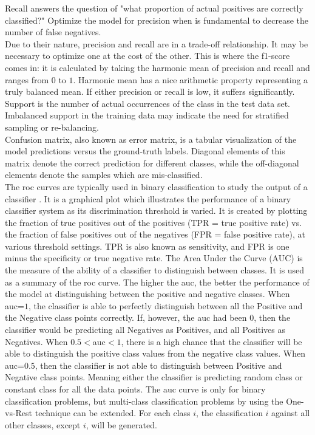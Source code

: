 \noindent Recall answers the question of "what proportion of actual positives are correctly  classified?" Optimize the model for precision when is fundamental to decrease the number of false negatives. \\

\noindent Due to their nature, precision and recall are in a trade-off relationship. It may be necessary to optimize one at the cost of the other. This is where the f1-score comes in: it is calculated by taking the harmonic mean of precision and recall and ranges from $0$ to $1$. Harmonic mean has a nice arithmetic property representing a truly balanced mean. If either precision or recall is low, it suffers significantly. \\

\noindent Support is the number of actual occurrences of the class in the test data set. Imbalanced support in the training data may indicate the need for stratified sampling or re-balancing. \\

\noindent Confusion matrix, also known as error matrix, is a tabular visualization of the model predictions versus the ground-truth labels. Diagonal elements of this matrix denote the correct prediction for different classes, while the off-diagonal elements denote the samples which are mis-classified. \\

\noindent The \gls{roc} curves are typically used in binary classification to study the output of a classifier \cite{Receiver5:online}. It is a graphical plot which illustrates the performance of a binary classifier system as its discrimination threshold is varied. It is created by plotting the fraction of true positives out of the positives (TPR = true positive rate) vs. the fraction of false positives out of the negatives (FPR = false positive rate), at various threshold settings. TPR is also known as sensitivity, and FPR is one minus the specificity or true negative rate. The Area Under the Curve (AUC) is the measure of the ability of a classifier to distinguish between classes. It is used as a summary of the \gls{roc} curve. The higher the \gls{auc}, the better the performance of the model at distinguishing between the positive and negative classes. When \gls{auc}=$1$, the classifier is able to perfectly distinguish between all the Positive and the Negative class points correctly. If, however, the \gls{auc} had been $0$, then the classifier would be predicting all Negatives as Positives, and all Positives as Negatives. When $0.5<$\gls{auc}$<1$, there is a high chance that the classifier will be able to distinguish the positive class values from the negative class values. When \gls{auc}=$0.5$, then the classifier is not able to distinguish between Positive and Negative class points. Meaning either the classifier is predicting random class or constant class for all the data points. The \gls{auc} curve is only for binary classification problems, but multi-class classification problems by using the One-vs-Rest technique can be extended. For each class $i$, the classification $i$ against all other classes, except $i$, will be generated. \\

